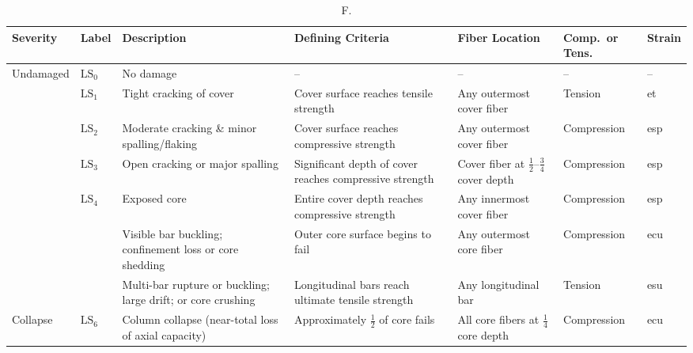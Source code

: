\begin{table}[H]
\centering
\caption{F.}
\label{tab:DS-F}
\begin{adjustbox}{width=1\textwidth}
\renewcommand{\arraystretch}{1.4}
\begin{tabular}{>{\centering\arraybackslash}m{1.8cm}
                 >{\centering\arraybackslash}m{1.0cm}
                 m{3.8cm}
                 m{4.8cm}
                 m{3.2cm}
                 >{\centering\arraybackslash}m{2.2cm}
                 >{\centering\arraybackslash}m{1.2cm}}
\toprule
\textbf{Severity} & \textbf{Label} & \textbf{Description} & \textbf{Defining Criteria} &
\textbf{Fiber Location} & \textbf{Comp.\ or Tens.} & \textbf{Strain} \\
\midrule

Undamaged       & $\mathrm{LS}_{0}$ & No damage & -- & -- & -- & -- \\
\cmidrule{2-7}
\multirow{3}{*}{Cosmetic}
                & $\mathrm{LS}_{1}$ & Tight cracking of cover &
  Cover surface reaches tensile strength &
  Any outermost cover fiber & Tension & \gls{et} \\
                & $\mathrm{LS}_{2}$ & Moderate cracking \& minor spalling/flaking &
  Cover surface reaches compressive strength &
  Any outermost cover fiber & Compression & \gls{esp} \\
                & $\mathrm{LS}_{3}$ & Open cracking or major spalling &
  Significant depth of cover reaches compressive strength &
  Cover fiber at $\tfrac{1}{2}$--$\tfrac{3}{4}$ cover depth & Compression & \gls{esp} \\
\cmidrule{2-7}
\multirow{3}{*}{Structural}
                & $\mathrm{LS}_{4}$ & Exposed core &
  Entire cover depth reaches compressive strength &
  Any innermost cover fiber & Compression & \gls{esp} \\
                & \multirow{2}{*}{$\mathrm{LS}_{5}$} &
  Visible bar buckling; confinement loss or core shedding &
  Outer core surface begins to fail &
  Any outermost core fiber & Compression & \gls{ecu} \\
                & & Multi-bar rupture or buckling; large drift; or core crushing &
  Longitudinal bars reach ultimate tensile strength &
  Any longitudinal bar & Tension & \gls{esu} \\
\cmidrule{2-7}
Collapse        & $\mathrm{LS}_{6}$ & Column collapse (near-total loss of axial capacity) &
  Approximately $\tfrac{1}{2}$ of core fails &
  All core fibers at $\tfrac{1}{4}$ core depth & Compression & \gls{ecu} \\
\bottomrule
\end{tabular}
\end{adjustbox}
\end{table}

